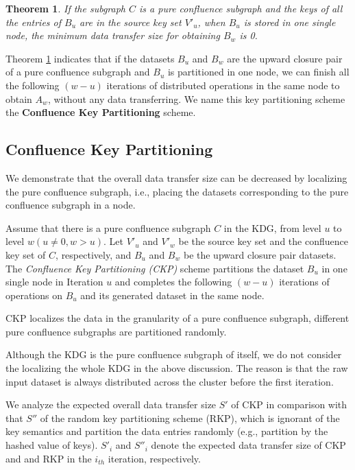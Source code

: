 \documentclass[10pt,journal,compsoc]{IEEEtran}
\begin{document}
\newtheorem{conduction}{\textbf{Theorem}}[theorem] 
\begin{conduction}\label{thm:zeroTransfer}
If the subgraph $C$ is a pure confluence subgraph and the keys of all the entries of $B_u$ are in the source key set $V'_u$, 
when $B_u$ is stored in one single node, 
the minimum data transfer size for obtaining $B_w$ is 0. 
\end{conduction}

Theorem \ref{thm:zeroTransfer} indicates that if the datasets $B_u$ and $B_w$ are 
the upward closure pair of a pure confluence subgraph 
and $B_u$ is partitioned in one node, 
we can finish all the following $(w-u)$ iterations of distributed operations in the same node to obtain $A_w$, 
without any data transferring. 
We name this key partitioning scheme the \textbf{Confluence Key Partitioning} scheme. 


\subsection{Confluence Key Partitioning}\label{section:CKP}
We demonstrate that the overall data transfer size can be decreased by 
localizing the pure confluence subgraph, 
i.e., placing the datasets corresponding to the pure confluence subgraph in a node. 

Assume that there is a pure confluence subgraph $C$ in the KDG, 
from level $u$ to level $w(u \neq 0, w>u)$. 
Let $V'_u$ and $V'_w$ be the source key set and the confluence key set of $C$, respectively, and $B_u$ and $B_w$ be the upward closure pair datasets. 
The \emph{Confluence Key Partitioning (CKP)} scheme partitions the dataset $B_u$ %
in one single node in Iteration $u$
and completes the following $(w-u)$ iterations of operations on $B_u$ and its generated dataset in the same node. 

CKP localizes the data in the granularity of a pure confluence subgraph, different pure confluence subgraphs are partitioned randomly. 

Although the KDG is the pure confluence subgraph of itself,
we do not consider the localizing the whole KDG in the above discussion. 
The reason is that the raw input dataset %
is always distributed across the cluster before the first iteration. 

We analyze the expected overall data transfer size $S'$ of CKP
in comparison with that $S''$ of the random key partitioning scheme (RKP), which is ignorant of the key semantics and partition the data entries randomly (e.g., partition by the hashed value of keys). 
$S'_i$ and $S''_i$ denote the expected data transfer size of CKP and and RKP in the $i_{th}$ iteration, respectively.  
\end{document}
